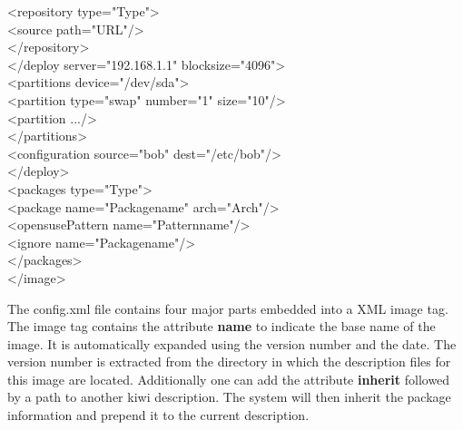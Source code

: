 \begin{itemize}
\begin{Command}{15cm}
      \hspace*{1cm}<repository type="Type">\\
      \hspace*{2cm}<source path="URL"/>\\
      \hspace*{1cm}</repository>\\
      \hspace*{1cm}</deploy server="192.168.1.1" blocksize="4096">\\
      \hspace*{2cm}<partitions device="/dev/sda">\\
      \hspace*{3cm}<partition type="swap" number="1" size="10"/>\\
      \hspace*{3cm}<partition .../>\\
      \hspace*{2cm}</partitions>\\
      \hspace*{2cm}<configuration source="bob" dest="/etc/bob"/>\\
      \hspace*{1cm}</deploy>\\
      \hspace*{1cm}<packages type="Type">\\
      \hspace*{2cm}<package name="Packagename" arch="Arch"/>\\
      \hspace*{2cm}<opensusePattern name="Patternname"/>\\
      \hspace*{2cm}<ignore name="Packagename"/>\\
      \hspace*{1cm}</packages>\\
      </image>
	  \end{Command}

      The config.xml file contains four major parts embedded into a
      XML image tag. The image tag contains the attribute \textbf{name}
      to indicate the base name of the image. It is automatically expanded
      using the version number and the date. The version number is
      extracted from the directory in which the description files for
      this image are located. Additionally one can add the attribute
      \textbf{inherit} followed by a path to another kiwi description.
      The system will then inherit the package information and prepend
      it to the current description.


\end{itemize}
